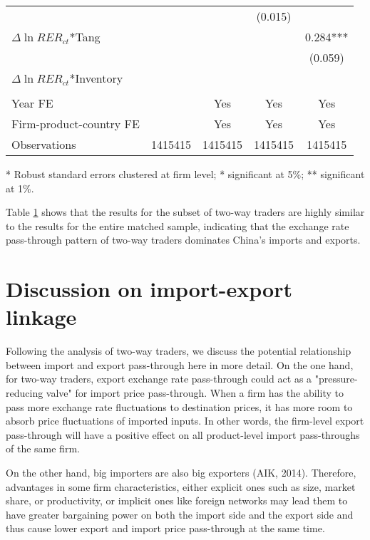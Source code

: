 \begin{table}[htbp]
\begin{threeparttable}
\begin{tabular}{lcccc}
		&       &       & (0.015) &  \\
		$\Delta \ln RER_{ct}$*Tang &       &       &       & 0.284*** \\
		&       &       &       & (0.059) \\
		$\Delta \ln RER_{ct}$*Inventory &       &       &       &  \\
		&       &       &       &  \\
		Year FE  &       & Yes   & Yes   & Yes \\
		Firm-product-country FE &       & Yes   & Yes   & Yes \\
		Observations & 1415415 & 1415415 & 1415415 & 1415415 \\
		\bottomrule
	\end{tabular}
	\label{tab6.3}
	\begin{tablenotes}
		\footnotesize
		\item[*] Robust standard errors clustered at firm level; * significant at 5\%; ** significant at 1\%.
	\end{tablenotes}
	\end{threeparttable}
\end{table}

Table \ref{tab6.3} shows that the results for the subset of two-way traders are highly similar to the results for the entire matched sample, indicating that the exchange rate pass-through pattern of two-way traders dominates China’s imports and exports. 

\section{Discussion on import-export linkage}

Following the analysis of two-way traders, we discuss the potential relationship between import and export pass-through here in more detail. On the one hand, for two-way traders, export exchange rate pass-through could act as a "pressure-reducing valve" for import price pass-through. When a firm has the ability to pass more exchange rate fluctuations to destination prices, it has more room to absorb price fluctuations of imported inputs. In other words, the firm-level export pass-through will have a positive effect on all product-level import pass-throughs of the same firm.

On the other hand, big importers are also big exporters (AIK, 2014\cite{aik2014}). Therefore, advantages in some firm characteristics, either explicit ones such as size, market share, or productivity, or implicit ones like foreign networks may lead them to have greater bargaining power on both the import side and the export side and thus cause lower export and import price pass-through at the same time. 

